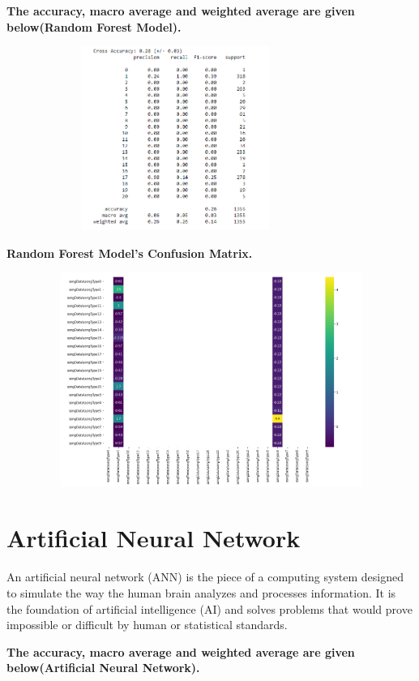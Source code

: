 \documentclass[11pt]{article}
\begin{document}
\begin{center}
\bf The accuracy, macro average and weighted average are given below(Random Forest Model).
\end{center}

\includegraphics[width=11cm, height=6cm]{RandomForestModel}

\begin{center}
\bf Random Forest Model's Confusion Matrix.
\end{center}

\includegraphics[width=16cm, height=7cm]{RandomForestMatrix}


\section{Artificial Neural Network}
An artificial neural network (ANN) is the piece of a computing system designed to simulate the way the human brain analyzes and processes information. It is the foundation of artificial intelligence (AI) and solves problems that would prove impossible or difficult by human or statistical standards.

\begin{center}
\bf The accuracy, macro average and weighted average are given below(Artificial Neural Network).
\end{center}
\end{document}
